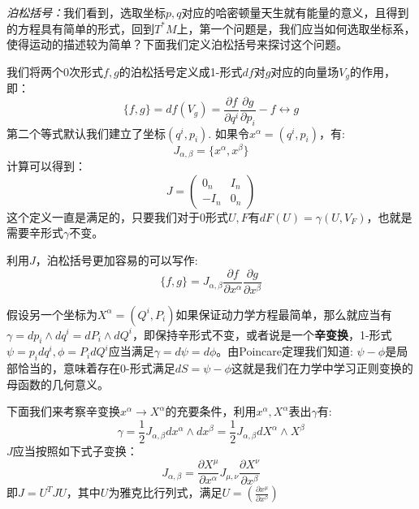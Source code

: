 \documentclass[supercite]{HustGraduPaper}
\begin{document}
    \textit{泊松括号：}我们看到，选取坐标$p,q$对应的哈密顿量天生就有能量的意义，且得到的方程具有简单的形式，回到$T^*M$上，第一个问题是，我们应当如何选取坐标系，使得运动的描述较为简单？下面我们定义泊松括号来探讨这个问题。
    
    
    我们将两个0次形式$f,g$的泊松括号定义成1-形式$df$对$g$对应的向量场$V_g$的作用，即：
    \begin{equation}
    \{f,g\} = df(V_g) = \frac{\partial f}{\partial q^i} \frac{\partial g}{\partial p_i} - f \leftrightarrow g
    \end{equation}
    第二个等式默认我们建立了坐标$(q^i,p_i)$. 如果令$x^\alpha = (q^i,p_i)$，有:
    \begin{equation}
    J_{\alpha,\beta}  = \{x^\alpha,x^\beta\}
    \end{equation}
   计算可以得到：
   \begin{equation}
   J = \left(\begin{array}{cc}
   0_n & I_n \\ 
   -I_n & 0_n
   \end{array} \right)
   \end{equation} 
   这个定义一直是满足的，只要我们对于0形式$U,F$有$dF(U) =\gamma(U,V_F)$，也就是需要辛形式$\gamma$不变。
   
   利用$J$，泊松括号更加容易的可以写作:
   \begin{equation}
   \{f,g\} = J_{\alpha,\beta} \frac{\partial f}{\partial x^\alpha}\frac{\partial g}{\partial x^\beta}
   \end{equation}
   
   
   假设另一个坐标为$X^\alpha = (Q^i,P_i)$如果保证动力学方程最简单，那么就应当有$\gamma = dp_i \wedge dq^i = dP_i \wedge dQ^i$，即保持辛形式不变，或者说是一个\textbf{辛变换}，1-形式$\psi = p_idq^i, \phi=P_idQ^i$应当满足$\gamma = d\psi = d\phi$。由Poincare定理我们知道: $\psi - \phi$是局部恰当的，意味着存在0-形式满足$dS = \psi -\phi$这就是我们在力学中学习正则变换的母函数的几何意义。
   
   下面我们来考察辛变换$x^\alpha \to X^\alpha$的充要条件，利用$x^\alpha, X^\alpha$表出$\gamma$有:
   \begin{equation}
   \gamma = \frac{1}{2}J_{\alpha,\beta}dx^\alpha \wedge dx^\beta = \frac{1}{2}J_{\alpha,\beta} dX^\alpha \wedge X^\beta 
   \end{equation}
   $J$应当按照如下式子变换：
   \begin{equation}
   J_{\alpha,\beta} = \frac{\partial X^\mu}{\partial x^\alpha} J_{\mu,\nu}\frac{\partial X^\nu}{\partial x^\beta} 
   \end{equation}
   即$J = U^T J U$，其中$U$为雅克比行列式，满足$U = (\frac{\partial x^\mu}{\partial x^\beta})$
   
\end{document}
